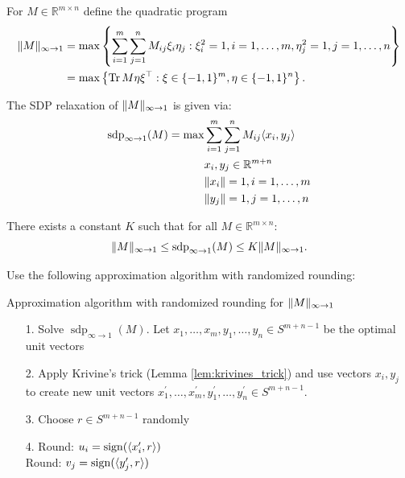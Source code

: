 	\begin{frame}
		\begin{dfn}
			For $M\in\mathbb{R}^{m\times n}$ define the quadratic program
			\begin{align}
				 \Vert {M} \Vert_{\infty\to 1} &= \max \left\{ \sum_{i=1}^m \sum_{j=1}^n M_{ij} \xi_i \eta_j : \xi_i^2=1, i=1,\dots,m, \eta_j^2=1, j =1,\dots,n \right\}  \nonumber\\
				&=\max\left\{\textup{Tr} \, {M \eta\xi^\top } : \xi\in\{-1,1\}^m,\eta\in\{-1,1\}^n\right\}.
			\end{align}
		\end{dfn}
		\begin{dfn} The SDP relaxation of $ \Vert {M} \Vert_{\infty\to1}$ is given via:
			\begin{align*}
				\operatorname{sdp}_{\infty\to 1} (M) = \max 
				&\sum_{i=1}^m\sum_{j=1}^n M_{ij} \langle{x_i},{y_j}\rangle\\
				&x_i,y_j\in\mathbb{R}^{m+n}\\
				& \Vert {x_i} \Vert=1, i=1,\dots,m\\
				& \Vert {y_j} \Vert=1, j=1,\dots,n
			\end{align*}
		\end{dfn}
	\end{frame}
	\begin{frame}
		\begin{theo} \label{theo:G_ineq}
			There exists a constant $K$ such that for all $M\in\mathbb{R}^{m\times n}$:
			\begin{equation}
				 \Vert {M} \Vert_{\infty\to 1} \leq \operatorname{sdp}_{\infty\to 1} (M) \leq K  \Vert {M} \Vert_{\infty\to 1}.
			\end{equation}
		\end{theo}
		\begin{pbmr}
			Use the following approximation algorithm with randomized rounding:
			\begin{algorithm}[H]
				\SetAlgoLined
				\caption{Approximation algorithm with randomized rounding for $ \Vert {M} \Vert_{\infty\to 1}$}
			\end{algorithm}
			\begin{itemize}
				\item[1.] Solve $\operatorname{sdp}_{\infty\to 1} (M)$. Let $x_1,\dots,x_m,y_1,\dots,y_n\in S^{m+n-1}$ be the optimal unit vectors
				\item[2.] Apply Krivine's trick (Lemma \ref{lem:krivines_trick}) and use vectors $x_i,y_j$ to create new unit vectors $x_1^\prime,\dots,x_m^\prime, y_1^\prime,\dots,y_n^\prime\in S^{m+n-1}$.
				\item[3.] Choose $r\in S^{m+n-1}$ randomly
				\item[4.] Round: $u_i = \operatorname{sign}(\langle{x_i^\prime},{r}\rangle)$\\
							\textcolor{blue!8}{Round: }$v_j = \operatorname{sign}(\langle{y_j^\prime},{r}\rangle)$
			\end{itemize}
		\end{pbmr}
	\end{frame}
